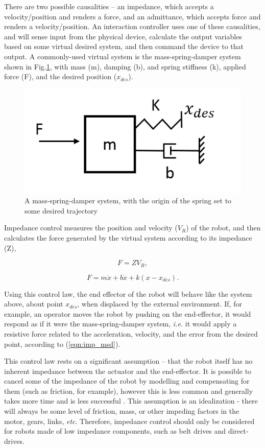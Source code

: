 \documentclass[12pt]{report}
\begin{document}
There are two possible causalities -- an impedance, which accepts a velocity/position and renders a force, and an admittance, which accepts force and renders a velocity/position. An interaction controller uses one of these causalities, and will sense input from the physical device, calculate the output variables based on some virtual desired system, and then command the device to that output. A commonly-used virtual system is the mass-spring-damper system shown in Fig.\ref{fig:mass-spring-damper}, with mass (m), damping (b), and spring stiffness (k), applied force (F), and the desired position ($x_{des}$). 

	\begin{figure}[h] 
		\centering
		\includegraphics[width=0.5\linewidth]{admittance_sys}
		\caption{A mass-spring-damper system, with the origin of the spring set to some desired trajectory}
		\label{fig:mass-spring-damper}
	\end{figure}
	
Impedance control measures the position and velocity ($V_R$) of the robot, and then calculates the force generated by the virtual system according to its impedance (Z),

\begin{equation} \label{eqn:imp}
	F = ZV_R,
\end{equation}  

\begin{equation} \label{eqn:imp_msd}
	F = m\ddot{x} + b\dot{x} + k(x - x_{des}).
\end{equation} 

Using this control law, the end effector of the robot will behave like the system above, about point $x_{des}$, when displaced by the external environment. If, for example, an operator moves the robot by pushing on the end-effector, it would respond as if it were the mass-spring-damper system, \textit{i.e.} it would apply a resistive force related to the acceleration, velocity, and the error from the desired point, according to (\ref{eqn:imp_msd}).

	This control law rests on a significant assumption -- that the robot itself has no inherent impedance between the actuator and the end-effector. It is possible to cancel some of the impedance of the robot by modelling and compensating for them (such as friction, for example), however this is less common and generally takes more time and is less successful \cite{Colgate1988}. This assumption is an idealization - there will always be some level of friction, mass, or other impeding factors in the motor, gears, links, \textit{etc}. Therefore, impedance control should only be considered for robots made of low impedance components, such as belt drives and direct-drives. 
	
\end{document}
